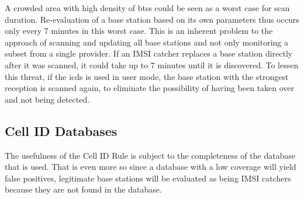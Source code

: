 A crowded area with high density of \glspl{bts} could be seen as a worst case for scan duration.
Re-evaluation of a base station based on its own parameters thus occurs only every 7 minutes in this worst case.
This is an inherent problem to the approach of scanning and updating all base stations and not only monitoring a subset from a single provider.
If an IMSI catcher replaces a base station directly after it was scanned, it could take up to 7 minutes until it is discovered.
To lessen this threat, if the \gls{icds} is used in user mode, the base station with the strongest reception is scanned again, to eliminate the possibility of having been taken over and not being detected.

\subsection{Cell ID Databases}
The usefulness of the Cell ID Rule is subject to the completeness of the database that is used.
That is even more so since a database with a low coverage will yield false positives, \eg legitimate base stations will be evaluated as being IMSI catchers because they are not found in the database.

